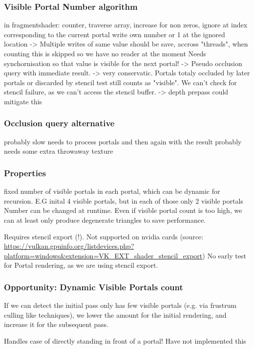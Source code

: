 \subsubsection{Visible Portal Number algorithm}
in fragmentshader: counter, traverse array, increase for non zeros, ignore at index corresponding to the current portal
write own number or 1 at the ignored location -> Multiple writes of same value should be save, accross "threads", when counting this is skipped so we have no reader at the moment
Needs synchornisation so that value is visible for the next portal!
-> Pseudo occlusion query with immediate result.
-> very conservatic. Portals totaly occluded by later portals or discarded by stencil test still counts as "visible". We can't check for stencil failure, as we can't access the stencil buffer.
-> depth prepass could mitigate this

\subsubsection{Occlusion query alternative}
probably slow
needs to process portals and then again with the result
probably needs some extra throwaway texture

\subsubsection{Properties}
fixed number of visible portals in each portal, which can be dynamic for recursion. E.G inital 4 visible portals, but in each of those only 2 visible portals
Number can be changed at runtime.
Even if visible portal count is too high, we can at least only produce degenerate triangles to save performance.

Requires stencil export (!). Not supported on nvidia cards (source: \url{https://vulkan.gpuinfo.org/listdevices.php?platform=windows&extension=VK_EXT_shader_stencil_export})
No early test for Portal rendering, as we are using stencil export.

\subsubsection{Opportunity: Dynamic Visible Portals count}
If we can detect the initial pass only has few visible portals (e.g. via frustrum culling like techniques), we lower the amount for the initial rendering, and increase it for
the subsequent pass.

Handles case of directly standing in front of a portal!
Have not implemented this

